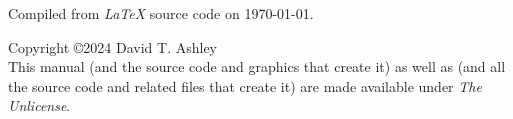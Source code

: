 \thispagestyle{empty}

\vspace*{1cm}
\begin{flushright}
\Huge\bfseries
\ucbkatitle{}
\end{flushright}
\vspace{0.0cm}
\vfill
\begin{flushright}
\begin{small}

\end{small}
\end{flushright}
\vspace{0.2cm}
\begin{flushright}
\begin{small}
Compiled from \emph{\LaTeX{}} source code on \today{}.
\end{small}
\end{flushright}

\pagebreak
\thispagestyle{empty}
\begin{small}
  \noindent Copyright \copyright 2024
  David T. Ashley\\
  This manual (and the source code and graphics that create it) as well
  as \emph{\productname{}} (and all the source code and related files that
  create it) are made available under \emph{The Unlicense}.
\end{small}

\vfill


